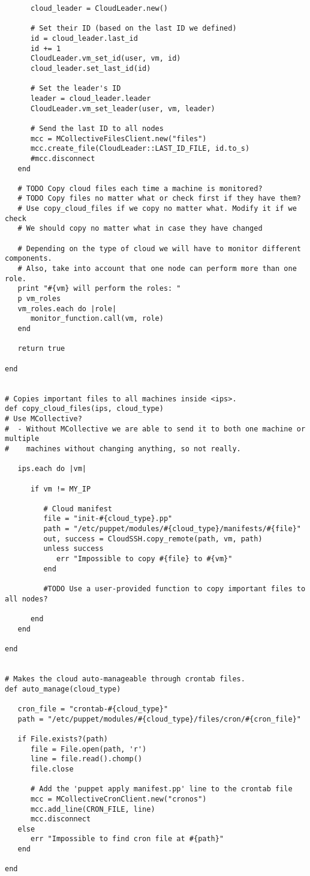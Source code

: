 \begin{lstlisting}
      cloud_leader = CloudLeader.new()

      # Set their ID (based on the last ID we defined)
      id = cloud_leader.last_id
      id += 1
      CloudLeader.vm_set_id(user, vm, id)
      cloud_leader.set_last_id(id)
      
      # Set the leader's ID
      leader = cloud_leader.leader
      CloudLeader.vm_set_leader(user, vm, leader)
      
      # Send the last ID to all nodes
      mcc = MCollectiveFilesClient.new("files")
      mcc.create_file(CloudLeader::LAST_ID_FILE, id.to_s)
      #mcc.disconnect
   end
   
   # TODO Copy cloud files each time a machine is monitored?
   # TODO Copy files no matter what or check first if they have them?
   # Use copy_cloud_files if we copy no matter what. Modify it if we check
   # We should copy no matter what in case they have changed
   
   # Depending on the type of cloud we will have to monitor different components.
   # Also, take into account that one node can perform more than one role.
   print "#{vm} will perform the roles: "
   p vm_roles
   vm_roles.each do |role|
      monitor_function.call(vm, role)
   end
   
   return true
   
end


# Copies important files to all machines inside <ips>.
def copy_cloud_files(ips, cloud_type)
# Use MCollective?
#  - Without MCollective we are able to send it to both one machine or multiple
#    machines without changing anything, so not really.

   ips.each do |vm|
   
      if vm != MY_IP
         
         # Cloud manifest
         file = "init-#{cloud_type}.pp"
         path = "/etc/puppet/modules/#{cloud_type}/manifests/#{file}"
         out, success = CloudSSH.copy_remote(path, vm, path)
         unless success
            err "Impossible to copy #{file} to #{vm}"
         end
         
         #TODO Use a user-provided function to copy important files to all nodes?

      end
   end
   
end


# Makes the cloud auto-manageable through crontab files.
def auto_manage(cloud_type)

   cron_file = "crontab-#{cloud_type}"
   path = "/etc/puppet/modules/#{cloud_type}/files/cron/#{cron_file}"
   
   if File.exists?(path)
      file = File.open(path, 'r')
      line = file.read().chomp()
      file.close
      
      # Add the 'puppet apply manifest.pp' line to the crontab file
      mcc = MCollectiveCronClient.new("cronos")
      mcc.add_line(CRON_FILE, line)
      mcc.disconnect
   else
      err "Impossible to find cron file at #{path}"
   end
   
end
\end{lstlisting}


